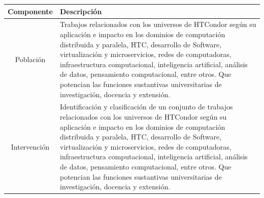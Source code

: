 \begin{table}[H]
	\centering
	\renewcommand{\arraystretch}{1.5} %
	\fontsize{9pt}{10pt}\selectfont %
	\begin{tabular}{|c|p{12cm}|} %
		\hline
		\textbf{Componente} & \textbf{Descripción}                                                                                                                                                                                                                                                                                                                                                                                                                                                                             \\ \hline

		Población           & Trabajos relacionados con los universos de HTCondor según su aplicación e impacto en los dominios de computación distribuida y paralela, HTC, desarrollo de Software, virtualización y microservicios, redes de computadoras, infraestructura computacional, inteligencia artificial, análisis de datos, pensamiento computacional, entre otros. Que potencian las funciones sustantivas universitarias de investigación, docencia y extensión.                                                  \\ \hline

		Intervención        & Identificación y clasificación de un conjunto de trabajos relacionados con los universos de HTCondor según su aplicación e impacto en los dominios de computación distribuida y paralela, HTC, desarrollo de Software, virtualización y microservicios, redes de computadoras, infraestructura computacional, inteligencia artificial, análisis de datos, pensamiento computacional, entre otros. Que potencian las funciones sustantivas universitarias de investigación, docencia y extensión. \\ \hline


\end{tabular}
\end{table}
